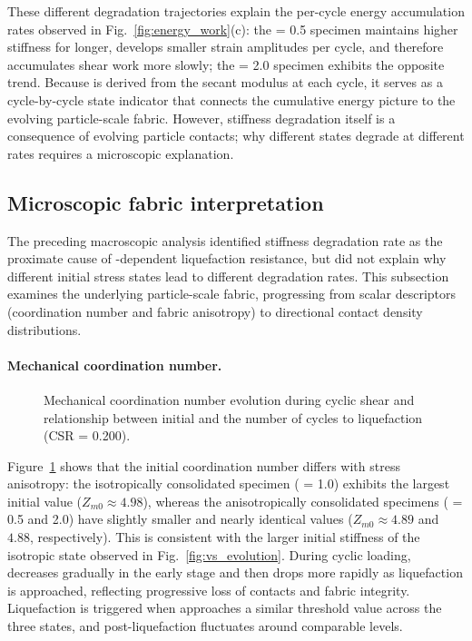 These different degradation trajectories explain the per-cycle energy accumulation rates observed in Fig.~\ref{fig:energy_work}(c): the \Kzero{} = 0.5 specimen maintains higher stiffness for longer, develops smaller strain amplitudes per cycle, and therefore accumulates shear work more slowly; the \Kzero{} = 2.0 specimen exhibits the opposite trend. Because \Vs{} is derived from the secant modulus at each cycle, it serves as a cycle-by-cycle state indicator that connects the cumulative energy picture to the evolving particle-scale fabric. However, stiffness degradation itself is a consequence of evolving particle contacts; why different \Kzero{} states degrade at different rates requires a microscopic explanation.

\subsection{Microscopic fabric interpretation}
\label{subsec:micro_fabric_results}

The preceding macroscopic analysis identified stiffness degradation rate as the proximate cause of \Kzero{}-dependent liquefaction resistance, but did not explain why different initial stress states lead to different degradation rates. This subsection examines the underlying particle-scale fabric, progressing from scalar descriptors (coordination number and fabric anisotropy) to directional contact density distributions.

\paragraph{Mechanical coordination number.}

\begin{figure}[t]
  \centering
  \caption{Mechanical coordination number evolution during cyclic shear and relationship between initial \Zm{} and the number of cycles to liquefaction (CSR = 0.200).}
  \label{fig:zm_evolution}
\end{figure}

Figure~\ref{fig:zm_evolution} shows that the initial coordination number differs with stress anisotropy: the isotropically consolidated specimen (\Kzero{} = 1.0) exhibits the largest initial value ($Z_{m0} \approx 4.98$), whereas the anisotropically consolidated specimens (\Kzero{} = 0.5 and 2.0) have slightly smaller and nearly identical values ($Z_{m0} \approx 4.89$ and $4.88$, respectively). This is consistent with the larger initial stiffness of the isotropic state observed in Fig.~\ref{fig:vs_evolution}. During cyclic loading, \Zm{} decreases gradually in the early stage and then drops more rapidly as liquefaction is approached, reflecting progressive loss of contacts and fabric integrity. Liquefaction is triggered when \Zm{} approaches a similar threshold value across the three states, and post-liquefaction \Zm{} fluctuates around comparable levels.

